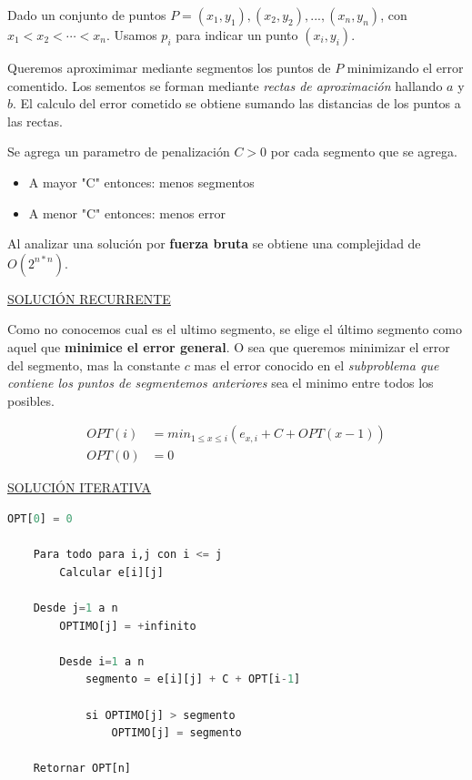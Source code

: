 \documentclass{article}
\begin{document}
Dado un conjunto de puntos \(P={(x_1,y_1),(x_2,y_2),...,(x_n,y_n)}\), con \(x_1<x_2<\cdots<x_n\). 
Usamos \(p_i\) para indicar un punto \((x_i, y_i)\). 

Queremos aproximimar mediante segmentos los puntos de \(P\) minimizando el error comentido. 
Los sementos se forman mediante \textit{rectas de aproximación} hallando \(a\) y \(b\). 
El calculo del error cometido se obtiene sumando las distancias de los puntos a las rectas. 

Se agrega un parametro de penalización \(C>0\) por cada segmento que se agrega.
\begin{itemize}
    \item A mayor "C" entonces: menos segmentos
    \item A menor "C" entonces: menos error
\end{itemize}

Al analizar una solución por \textbf{fuerza bruta} se obtiene una complejidad de \(O(2^{n*n})\).

\underline{SOLUCIÓN RECURRENTE}

Como no conocemos cual es el ultimo segmento, se elige el último segmento como aquel que \textbf{minimice el error general}.  
O sea que queremos minimizar el error del segmento, mas la constante \(c\) 
mas el error conocido en el \textit{subproblema que contiene los puntos de segmentemos anteriores} 
sea el minimo entre todos los posibles.


\begin{align*}
    OPT(i) &= min_{1 \leq x \leq i} (e_{x,i} + C + OPT(x-1)) \\ 
    OPT(0) &= 0
\end{align*}
    
\noindent
\underline{SOLUCIÓN ITERATIVA}

\begin{lstlisting}[language=Python, caption=Solución iterativa]
    OPT[0] = 0

    Para todo para i,j con i <= j
        Calcular e[i][j]

    Desde j=1 a n
        OPTIMO[j] = +infinito
    
        Desde i=1 a n
            segmento = e[i][j] + C + OPT[i-1]

            si OPTIMO[j] > segmento 
                OPTIMO[j] = segmento

    Retornar OPT[n]

\end{lstlisting}
\end{document}
